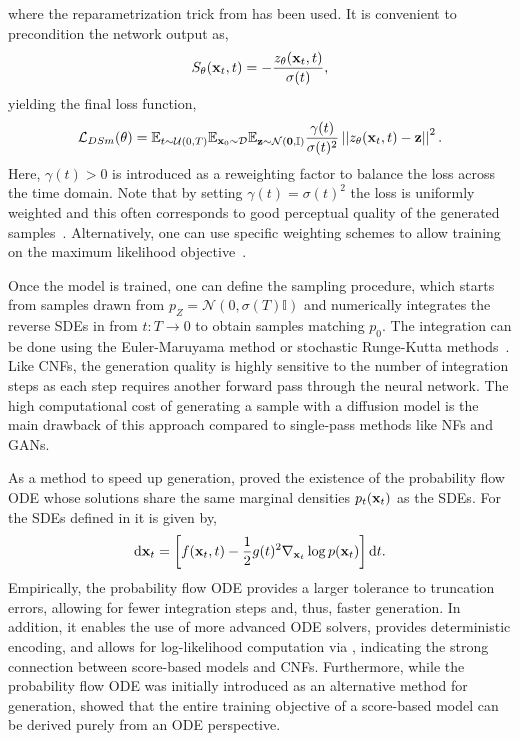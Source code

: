 where the reparametrization trick from  has been used.
It is convenient to precondition the network output as,
\begin{equation}
    \label{eq:precondition}
    S_\theta(\mathbf{x}_t, t) = - \frac{z_\theta(\mathbf{x}_t, t)}{\sigma(t)},
\end{equation}
yielding the final loss function,
\begin{equation}
    \label{eq:noise_loss}
    \mathcal{L}_{DSm}(\theta) =
    \mathbb{E}_{t \sim \mathcal{U}(0, T)}
    \mathbb{E}_{\mathbf{x}_0 \sim \mathcal{D}}
    \mathbb{E}_{\mathbf{z} \sim \mathcal{N}(\mathbf{0}, \mathbb{I})}
    \frac{\gamma(t)}{\sigma(t)^2}
    \left|\left|z_\theta(\mathbf{x}_t, t) - \mathbf{z}\right|\right|^2.
\end{equation}
Here, $\gamma(t) > 0$ is introduced as a reweighting factor to balance the loss across the time domain.
Note that by setting $\gamma(t) = \sigma(t)^2$ the loss is uniformly weighted and this often corresponds to good perceptual quality of the generated samples~\cite{VariationalPerspectiveDiffusionBased, VariationalDiffusionModels, ImprovedDenoisingDiffusion}.
Alternatively, one can use specific weighting schemes to allow training on the maximum likelihood objective~\cite{UnderstandingDiffusionModels}.

Once the model is trained, one can define the sampling procedure, which starts from samples drawn from $p_Z=\mathcal{N}(0, \sigma(T) \mathbb{I})$ and numerically integrates the reverse \Glspl{SDE} in  from $t: T \rightarrow 0$ to obtain samples matching $p_0$.
The integration can be done using the Euler-Maruyama method or stochastic Runge-Kutta methods~\cite{NumericalSolutionStochastic}.
Like \Glspl{CNF}, the generation quality is highly sensitive to the number of integration steps as each step requires another forward pass through the neural network.
The high computational cost of generating a sample with a diffusion model is the main drawback of this approach compared to single-pass methods like NFs and \Glspl{GAN}.

As a method to speed up generation, \textcite{ScoreBasedGenerativeModeling} proved the existence of the probability flow \Gls{ODE} whose solutions share the same marginal densities $p_t(\mathbf{x}_t)$ as the \Glspl{SDE}.
For the \Glspl{SDE} defined in  it is given by,
\begin{equation}
    \label{eq:probability_flow}
    \mathrm{d} \mathbf{x}_t = \left[f(\mathbf{x}_t, t) - \frac{1}{2} g(t)^2 \nabla_{\mathbf{x}_t} \log p(\mathbf{x}_t)\right] \mathrm{d} t.
\end{equation}
Empirically, the probability flow \Gls{ODE} provides a larger tolerance to truncation errors, allowing for fewer integration steps and, thus, faster generation.
In addition, it enables the use of more advanced \Gls{ODE} solvers, provides deterministic encoding, and allows for log-likelihood computation via , indicating the strong connection between score-based models and \Glspl{CNF}.
Furthermore, while the probability flow \Gls{ODE} was initially introduced as an alternative method for generation, \textcite{ElucidatingDesignSpace} showed that the entire training objective of a score-based model can be derived purely from an \Gls{ODE} perspective.

